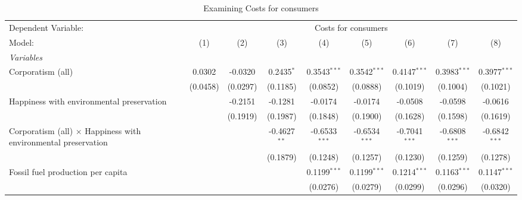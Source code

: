 
\begin{table}[htbp]
   \caption{Examining Costs for consumers}
   \centering
   \begin{tabular}{lcccccccc}
      \tabularnewline \midrule \midrule
      Dependent Variable: & \multicolumn{8}{c}{Costs for consumers}\\
      Model:                                                                & (1)      & (2)      & (3)            & (4)             & (5)                   & (6)             & (7)                  & (8)\\  
      \midrule
      \emph{Variables}\\
      Corporatism (all)                                                     & 0.0302   & -0.0320  & 0.2435$^{*}$   & 0.3543$^{***}$  & 0.3542$^{***}$        & 0.4147$^{***}$  & 0.3983$^{***}$       & 0.3977$^{***}$\\   
                                                                            & (0.0458) & (0.0297) & (0.1185)       & (0.0852)        & (0.0888)              & (0.1019)        & (0.1004)             & (0.1021)\\   
      Happiness with environmental preservation                             &          & -0.2151  & -0.1281        & -0.0174         & -0.0174               & -0.0508         & -0.0598              & -0.0616\\   
                                                                            &          & (0.1919) & (0.1987)       & (0.1848)        & (0.1900)              & (0.1628)        & (0.1598)             & (0.1619)\\   
      Corporatism (all) $\times$ Happiness with environmental preservation  &          &          & -0.4627$^{**}$ & -0.6533$^{***}$ & -0.6534$^{***}$       & -0.7041$^{***}$ & -0.6808$^{***}$      & -0.6842$^{***}$\\   
                                                                            &          &          & (0.1879)       & (0.1248)        & (0.1257)              & (0.1230)        & (0.1259)             & (0.1278)\\   
      Fossil fuel production per capita                                     &          &          &                & 0.1199$^{***}$  & 0.1199$^{***}$        & 0.1214$^{***}$  & 0.1163$^{***}$       & 0.1147$^{***}$\\   
                                                                            &          &          &                & (0.0276)        & (0.0279)              & (0.0299)        & (0.0296)             & (0.0320)\\   

\end{tabular}
\end{table}
